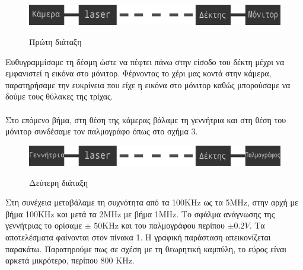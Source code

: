 \documentclass[a4paper,11pt,titlepage]{article}
\begin{document}
\begin{figure}[h!]
\centering
\includegraphics[width=120mm]{img_1.pdf}\\[0.3cm]
\caption{Πρώτη διάταξη}
\end{figure}

Ευθυγραμμίσαμε τη δέσμη ώστε να πέφτει πάνω στην είσοδο του δέκτη μέχρι να εμφανιστεί η εικόνα στο μόνιτορ. Φέρνοντας το χέρι μας κοντά στην κάμερα, παρατηρήσαμε την ευκρίνεια που είχε η εικόνα στο μόνιτορ καθώς μπορούσαμε να δούμε τους θύλακες της τρίχας.\\\\
Στο επόμενο βήμα, στη θέση της κάμερας βάλαμε τη γεννήτρια και στη θέση του μόνιτορ συνδέσαμε τον παλμογράφο όπως στο σχήμα 3.

\begin{figure}[h!]
\centering
\includegraphics[width=120mm]{img_2.pdf}\\[0.3cm]
\caption{Δεύτερη διάταξη}
\end{figure}

Στη συνέχεια μεταβάλαμε τη συχνότητα από τα 100KHz ως τα 5MHz, στην αρχή με βήμα 100KHz και μετά τα 2MHz με βήμα 1ΜHz. Το σφάλμα ανάγνωσης της γεννήτριας το ορίσαμε $\pm$ 50KHz και του παλμογράφου περίπου $\pm 0.2V$. Τα αποτελέσματα φαίνονται στον πίνακα 1. Η γραφική παράσταση απεικονίζεται παρακάτω. 
Παρατηρούμε πως σε σχέση με τη θεωρητική καμπύλη, το εύρος είναι αρκετά μικρότερο, περίπου 800 KHz.  
\end{document}
